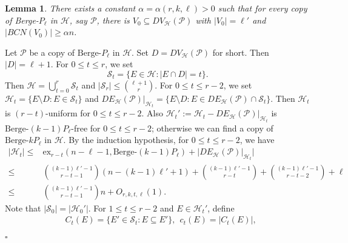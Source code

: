 \documentclass[12pt]{article}%
\newtheorem{lemma}[theorem]{Lemma}
\newenvironment{proof}{{\noindent\it Proof.}}{\hfill $\square$\par}
\newcommand{\ber}{\text{Berge-}}
\newcommand{\mh}{\mathcal{H}}
\begin{document}
 \begin{lemma}\label{lem: enough Berge common}
     There exists a constant $\alpha=\alpha(r,k,\ell)>0$ such that for every copy of Berge-$P_{\ell}$ in $\mathcal{H}$, say $\mathcal{P}$, there is $V_0\subseteq DV_\mh(\mathcal{P})$ with $|V_0|=
     \ell'$ and $|BCN(V_0)|\ge\alpha n$.
 \end{lemma}
 \begin{proof} Let $\mathcal{P}$ be  a copy of $\ber P_{\ell}$ in $\mh$. Set $D=DV_\mh(\mathcal{P})$ for short. Then $|D|=\ell+1$. For $0\le t\le r$, we set
         $$\mathcal{S}_t=\{E\in \mathcal{H}:|E\cap D|=t\}.$$
     Then $\mathcal{H}=\bigcup_{t=0}^{r}\mathcal{S}_t$ and $|\mathcal{S}_r|\leq \binom{\ell+1}{r}$.
     For $0\le t\le r-2$, we set $\mh_t=\{E\setminus D: E\in \mathcal{S}_t\}$ and $DE_\mh(\mathcal{P})|_{\mh_t}=\{E\setminus D: E\in DE_\mh(\mathcal{P})\cap \mathcal{S}_t\}$. Then $\mh_t$ is  $(r-t)$-uniform for $0\le t\le r-2$. Also $\mh_t':=\mh_t-DE_\mh(\mathcal{P})|_{\mh_t}$ is $\ber (k-1)P_{\ell}$-free for $0\le t\le r-2$; otherwise we can find a copy of $\ber kP_{\ell}$ in $\mh$.
    By the induction hypothesis, for $0\le t\le r-2$, we have
     \begin{equation}\label{lemm4-2}
         \begin{aligned}
             |\mh_t|\leq & \mathrm{ex}_{r-t}(n- \ell-1,\ber (k-1)P_{\ell})+|DE_\mh(\mathcal{P})|_{\mh_t}|\\
             \leq & \binom{(k-1)\ell'-1}{r-t-1}(n-(k-1)\ell'+1)+\binom{(k-1)\ell'-1}{r-t}+\binom{(k-1)\ell'-1}{r-t-2}+\ell\\
             \leq &  \binom{(k-1)\ell'-1}{r-t-1}n+O_{r,k,t,\ell}(1).
         \end{aligned}
     \end{equation}
    Note that    $|\mathcal{S}_0|=|\mh_0'|.$ For $1\le t\le r-2$ and $E\in \mh_t'$, define
          \begin{equation*}
         \begin{aligned}
         &C_t(E)=\{E'\in \mathcal{S}_t : E\subseteq E'\},~~c_t(E)=|C_t(E)|,\\

\end{aligned}
\end{equation*}
\end{proof}
\end{document}
